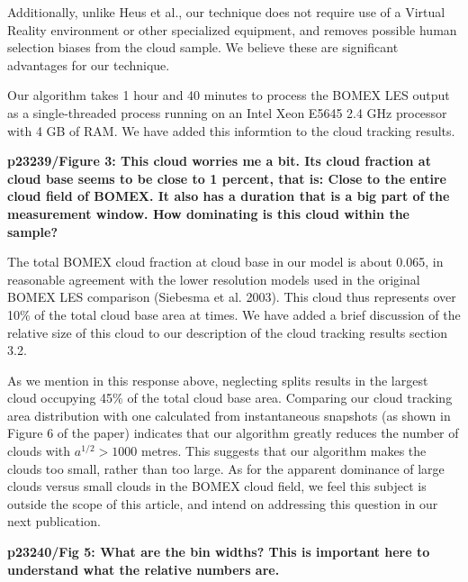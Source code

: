 \documentclass[12pt]{article}
\begin{document}
Additionally, unlike Heus et al., our technique does not require use of a 
Virtual Reality environment or other specialized equipment, and removes 
possible human selection biases from the cloud sample.  We believe these are
significant advantages for our technique.

Our algorithm takes 1 hour and 40 minutes to process the BOMEX LES output as a 
single-threaded process running on an Intel Xeon E5645 2.4 GHz processor with 
4 GB of RAM. We have added this informtion to the cloud tracking results.

\vspace{5mm}

\textbf{p23239/Figure 3: This cloud worries me a bit. Its cloud fraction at 
cloud base seems to be close to 1 percent, that is: Close to the entire cloud 
field of BOMEX. It also has a duration that is a big part of the measurement 
window. How dominating is this cloud within the sample?}

\vspace{5mm}

The total BOMEX cloud fraction at cloud base in our model is about 0.065, 
in reasonable agreement with the lower resolution models used in the original
BOMEX LES comparison (Siebesma et al. 2003).  This cloud thus represents over 
10\% of the total cloud base area at times.  We have added a brief discussion
of the relative size of this cloud to our description of the cloud tracking 
results section 3.2. 

As we mention in this response above, neglecting splits results in the largest 
cloud occupying 45\% of the total cloud base area. Comparing our cloud tracking 
area distribution with one calculated from instantaneous snapshots (as shown in
Figure 6 of the paper) indicates that our algorithm greatly reduces the number 
of clouds with $a^{1/2} > 1000$ metres. This suggests that our algorithm makes 
the clouds too small, rather than too large.  As for the apparent dominance of 
large clouds versus small clouds in the BOMEX cloud field, we feel this subject 
is outside the scope of this article, and intend on addressing this question in 
our next publication.

\vspace{5mm}

\textbf{p23240/Fig 5: What are the bin widths? This is important here to 
understand what the relative numbers are.}

\vspace{5mm}
\end{document}
